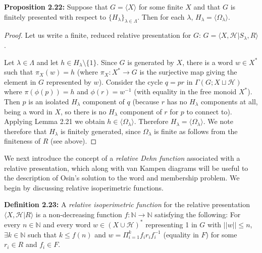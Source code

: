 \documentclass[12pt]{article}
\newcommand{\vs}{\vskip10pt}
\begin{document}
	\textbf{Proposition 2.22: } Suppose that $G = \langle X \rangle$ for some finite $X$ and that $G$ is finitely presented with respect to $\{H_{\lambda}\}_{\lambda \in \Lambda}$. Then for each $\lambda$, $H_{\lambda} = \langle \Omega_{\lambda} \rangle$. 
	
	\begin{proof}
		
		Let us write a finite, reduced relative presentation for $G$: $G = \langle X, \mathcal{H} \vert S_{\lambda}, R \rangle$. 
		
		\vs 
		
		Let $\lambda \in \Lambda$ and let $h \in H_{\lambda} \setminus \{1\}$. Since $G$ is generated by $X$, there is a word $w \in X^*$ such that $\pi_X(w) = h$ (where $\pi_X: X^* \rightarrow G$ is the surjective map giving the element in $G$ represented by $w$). Consider the cycle $q = pr$ in $\Gamma(G; X \sqcup \mathcal{H})$ where $\pi(\phi(p)) = h$ and $\phi(r) = w^{-1}$ (with equality in the free monoid $X^*$). Then $p$ is an isolated $H_{\lambda}$ component of $q$ (because $r$ has no $H_{\lambda}$ components at all, being a word in $X$, so there is no $H_{\lambda}$ component of $r$ for $p$ to connect to). Applying Lemma 2.21 we obtain $h \in \langle \Omega_{\lambda} \rangle$. Therefore $H_{\lambda} = \langle \Omega_{\lambda} \rangle$. We note therefore that $H_{\lambda}$ is finitely generated, since $\Omega_{\lambda}$ is finite as follows from the finiteness of $R$ (see above). 
		
	\end{proof}

	We next introduce the concept of a \textit{relative Dehn function} associated with a relative presentation, which along with van Kampen diagrams will be useful to the description of Osin's solution to the word and membership problem. We begin by discussing relative isoperimetric functions. 
	
	\vs 
	
	\textbf{Definition 2.23: } A \textit{relative isoperimetric function} for the relative presentation $\langle X, \mathcal{H} \vert R \rangle$ is a non-decreasing function $f: \mathbb{N} \rightarrow \mathbb{N}$ satisfying the following: For every $n \in \mathbb{N}$ and every word $w \in (X \cup \mathcal{H})^*$ representing 1 in $G$ with $\vert \vert w \vert \vert \leq n$, $\exists k \in \mathbb{N}$ such that $k \leq f(n)$ and $w = \Pi_{i=1}^k f_i r_i f_i^{-1}$ (equality in $F$) for some $r_i \in R$ and $f_i \in F$. 
	
	\vs 
	
\end{document}
